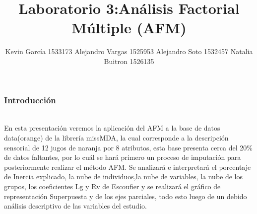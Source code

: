 \documentclass[12pt]{beamer}
\author[Kevin - Alejandro x2 - Natalia ]{Kevin García 1533173 \newline Alejandro Vargas 1525953 \newline Alejandro Soto 1532457 \newline Natalia Buitron 1526135}
\title[Análisis Factorial Múltiple (AFM)]{Laboratorio 3:Análisis Factorial Múltiple (AFM)}
\begin{document}
\justifying
\begin{frame}[plain]
\maketitle
\end{frame}


\begin{frame}
\frametitle{Introducción}
~\\En esta presentación veremos la aplicación del AFM a la base de datos data(orange) de la librería missMDA, la cual corresponde a la descripción sensorial de 12 jugos de naranja por 8 atributos, esta base presenta cerca del 20\% de datos faltantes, por lo cuál se hará primero un proceso de imputación para posteriormente realizar el método AFM. Se analizará e interpretará el porcentaje de Inercia explicado, la nube de individuos,la nube de variables, la nube de los grupos, los coeficientes Lg y Rv de Escoufier y se realizará el gráfico de representación Superpuesta y de los ejes parciales, todo esto luego de un debido análisis descriptivo de las variables del estudio.
\end{frame}
\end{document}
